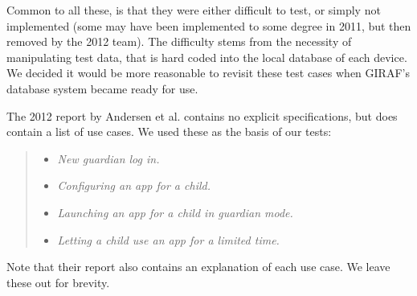 Common to all these, is that they were either difficult to test, or simply not implemented (some may have been implemented to some degree in 2011, but then removed by the 2012 team). The difficulty stems from the necessity of manipulating test data, that is hard coded into the local database of each device. We decided it would be more reasonable to revisit these test cases when GIRAF's database system became ready for use.

The 2012 report by Andersen et al. \cite{launcher2012} contains no explicit specifications, but does contain a list of use cases. We used these as the basis of our tests:
\begin{quote}
\begin{itemize}
	\item \textit{New guardian log in.}
	\item \textit{Configuring an app for a child.}
	\item \textit{Launching an app for a child in guardian mode.}
	\item \textit{Letting a child use an app for a limited time.}
\end{itemize}
\end{quote}
Note that their report also contains an explanation of each use case. We leave these out for brevity.






